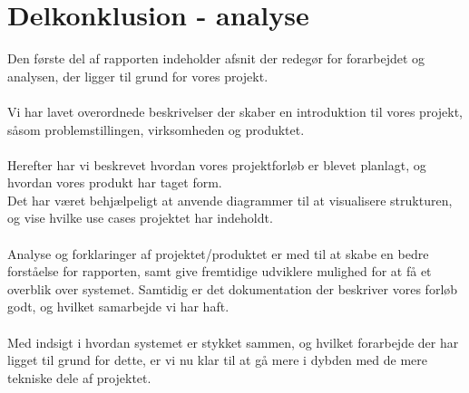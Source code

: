\hypertarget{delkonklusion-analyse}{}
\section{Delkonklusion - analyse}
Den første del af rapporten indeholder afsnit der redegør for forarbejdet og analysen, der ligger til grund for vores projekt.
\\\\
Vi har lavet overordnede beskrivelser der skaber en introduktion til vores projekt, såsom problemstillingen, virksomheden og produktet.
\\\\
Herefter har vi beskrevet hvordan vores projektforløb er blevet planlagt, og hvordan vores produkt har taget form.\\
Det har været behjælpeligt at anvende diagrammer til at visualisere strukturen, og vise hvilke use cases projektet har indeholdt.
\\\\
Analyse og forklaringer af projektet/produktet er med til at skabe en bedre forståelse for rapporten, samt give fremtidige udviklere
mulighed for at få et overblik over systemet. Samtidig er det dokumentation der beskriver vores forløb godt, og hvilket samarbejde vi har haft.
\\\\
Med indsigt i hvordan systemet er stykket sammen, og hvilket forarbejde der har ligget til grund for dette, er vi nu klar til at gå mere i dybden
med de mere tekniske dele af projektet.
